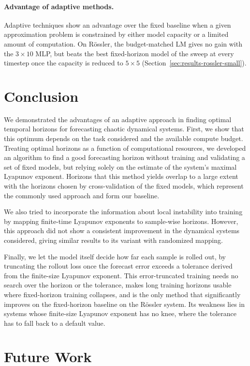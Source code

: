 \documentclass{article}
\begin{document}
\paragraph{Advantage of adaptive methods.}
Adaptive techniques show an advantage over the fixed baseline when a given approximation problem is constrained by either model capacity or a limited amount of computation. On Rössler, the budget-matched LM gives no gain with the $3 \times 10$ MLP, but beats the best fixed-horizon model of the sweep at every timestep once the capacity is reduced to $5 \times 5$ (Section~\ref{sec:results-rossler-small}).

\section{Conclusion}

We demonstrated the advantages of an adaptive approach in finding optimal temporal horizons for forecasting chaotic dynamical systems. First, we show that this optimum depends on the task considered and the available compute budget. Treating optimal horizons as a function of computational resources, we developed an algorithm to find a good forecasting horizon without training and validating a set of fixed models, but relying solely on the estimate of the system's maximal Lyapunov exponent. Horizons that this method yields overlap to a large extent with the horizons chosen by cross-validation of the fixed models, which represent the commonly used approach and form our baseline.

We also tried to incorporate the information about local instability into training by mapping finite-time Lyapunov exponents to sample-wise horizons. However, this approach did not show a consistent improvement in the dynamical systems considered, giving similar results to its variant with randomized mapping.

Finally, we let the model itself decide how far each sample is rolled out, by truncating the rollout loss once the forecast error exceeds a tolerance derived from the finite-size Lyapunov exponent. This error-truncated training needs no search over the horizon or the tolerance, makes long training horizons usable where fixed-horizon training collapses, and is the only method that significantly improves on the fixed-horizon baseline on the Rössler system. Its weakness lies in systems whose finite-size Lyapunov exponent has no knee, where the tolerance has to fall back to a default value.

\section{Future Work}
\end{document}
